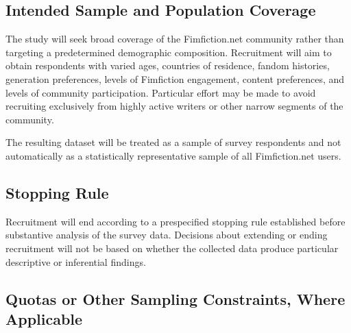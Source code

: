 
\subsection{Intended Sample and Population Coverage}

The study will seek broad coverage of the Fimfiction.net community rather than targeting a predetermined demographic composition. Recruitment will aim to obtain respondents with varied ages, countries of residence, fandom histories, generation preferences, levels of Fimfiction engagement, content preferences, and levels of community participation. Particular effort may be made to avoid recruiting exclusively from highly active writers or other narrow segments of the community.

The resulting dataset will be treated as a sample of survey respondents and not automatically as a statistically representative sample of all Fimfiction.net users.


\subsection{Stopping Rule}

Recruitment will end according to a prespecified stopping rule established before substantive analysis of the survey data. Decisions about extending or ending recruitment will not be based on whether the collected data produce particular descriptive or inferential findings.


\subsection{Quotas or Other Sampling Constraints, Where Applicable}

